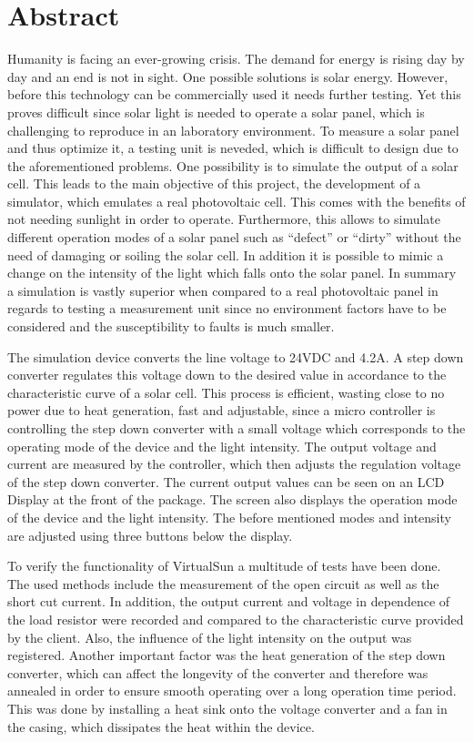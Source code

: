 \documentclass[a4paper]{fhnwreport}
\begin{document}
\section{Abstract}

Humanity is facing an ever-growing crisis. The demand for energy is rising day by day and an end is not in sight. One possible solutions is solar energy. However, before this technology can be commercially used it needs further testing. Yet this proves difficult since solar light is needed to operate a solar panel, which is challenging to reproduce in an laboratory environment. To measure a solar panel and thus optimize it, a testing unit is neveded, which is difficult to design due to the aforementioned problems. One possibility is to simulate the output of a solar cell. This leads to the main objective of this project, the development of a simulator, which emulates a real photovoltaic cell. This comes with the benefits of not needing sunlight in order to operate. Furthermore, this allows to simulate different operation modes of a solar panel such as ``defect'' or ``dirty'' without the need of damaging or soiling the solar cell. In addition it is possible to mimic a change on the intensity of the light which falls onto the solar panel. In summary a simulation is vastly superior when compared to a real photovoltaic panel in regards to testing a measurement unit%
since no environment factors have to be considered and the susceptibility to faults is much smaller. 

The simulation device converts the line voltage to 24VDC and 4.2A. A step down converter regulates this voltage down to the desired value in accordance to the characteristic curve of a solar cell. This process is efficient, wasting close to no power due to heat generation, fast and adjustable, since a micro controller is controlling the step down converter with a small voltage which corresponds to the operating mode of the device and the light intensity. The output voltage and current are measured by the controller, which then adjusts the regulation voltage of the step down converter. The current output values can be seen on an LCD Display at the front of the package. The screen also displays the operation mode of the device and the light intensity. The before mentioned modes and intensity are adjusted using three buttons below the display. 

To verify the functionality of VirtualSun a multitude of tests have been done. The used methods include the measurement of the open circuit as well as the short cut current. In addition, the output current and voltage in dependence of the load resistor were recorded and compared to the characteristic curve provided by the client. Also, the influence of the light intensity on the output was registered. Another important factor was the heat generation of the step down converter, which can affect the longevity of the converter and therefore was annealed in order to ensure smooth operating over a long operation time period. This was done by installing a heat sink onto the voltage converter and a fan in the casing, which dissipates the heat within the device.
\end{document}
